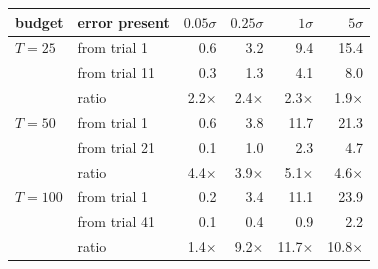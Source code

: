 \begin{tabular}{llrrrr}
\toprule
budget & error present & $0.05\sigma$ & $0.25\sigma$ & $1\sigma$ & $5\sigma$ \\
\midrule
$T=25$ & from trial 1 & 0.6 & 3.2 & 9.4 & 15.4 \\
 & from trial 11 & 0.3 & 1.3 & 4.1 & 8.0 \\
 & ratio & 2.2$\times$ & 2.4$\times$ & 2.3$\times$ & 1.9$\times$ \\
\midrule
$T=50$ & from trial 1 & 0.6 & 3.8 & 11.7 & 21.3 \\
 & from trial 21 & 0.1 & 1.0 & 2.3 & 4.7 \\
 & ratio & 4.4$\times$ & 3.9$\times$ & 5.1$\times$ & 4.6$\times$ \\
\midrule
$T=100$ & from trial 1 & 0.2 & 3.4 & 11.1 & 23.9 \\
 & from trial 41 & 0.1 & 0.4 & 0.9 & 2.2 \\
 & ratio & 1.4$\times$ & 9.2$\times$ & 11.7$\times$ & 10.8$\times$ \\
\bottomrule
\end{tabular}
